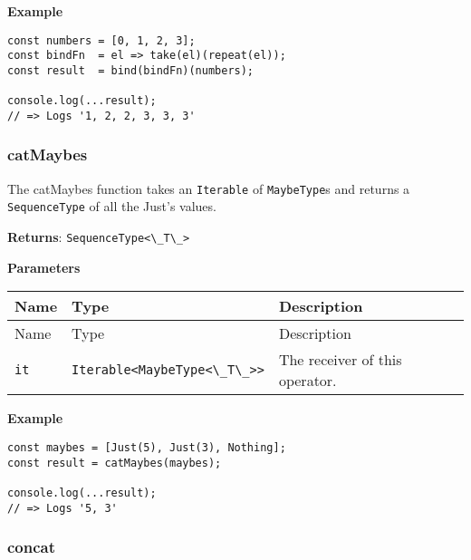 \textbf{Example}

\begin{lstlisting}[label=88beac1a-9eb8-42b2-b315-c2e69ef8bdbf]
const numbers = [0, 1, 2, 3];
const bindFn  = el => take(el)(repeat(el));
const result  = bind(bindFn)(numbers);
                                           
console.log(...result);
// => Logs '1, 2, 2, 3, 3, 3'
\end{lstlisting}

\hypertarget{341a8910-fef6-491a-ad04-e13dbd302b95}{%
\subsubsection{catMaybes}\label{341a8910-fef6-491a-ad04-e13dbd302b95}}

The catMaybes function takes an \passthrough{\lstinline!Iterable!} of
\passthrough{\lstinline!MaybeType!}s and returns a
\passthrough{\lstinline!SequenceType!} of all the Just's values.

\textbf{Returns}: \passthrough{\lstinline!SequenceType<\_T\_>!}

\textbf{Parameters}

\begin{longtable}[]{
  >{\raggedright\arraybackslash}p{}
  >{\raggedright\arraybackslash}p{}
  >{\raggedright\arraybackslash}p{}@{}}

\toprule\noalign{}
Name & Type & Description \\
\midrule\noalign{}
\endfirsthead
\toprule\noalign{}
Name & Type & Description \\
\midrule\noalign{}
\endhead
\bottomrule\noalign{}
\endlastfoot
\passthrough{\lstinline!it!} &
\passthrough{\lstinline!Iterable<MaybeType<\_T\_>>!} & The receiver of
this operator. \\
\end{longtable}

\textbf{Example}

\begin{lstlisting}[label=c921a7df-d43a-415d-a1b5-9889435c00cf]
const maybes = [Just(5), Just(3), Nothing];
const result = catMaybes(maybes);
                                           
console.log(...result);
// => Logs '5, 3'
\end{lstlisting}

\hypertarget{ff34208c-02f2-42f6-b821-a3deb97e4b1b}{%
\subsubsection{concat}\label{ff34208c-02f2-42f6-b821-a3deb97e4b1b}}

